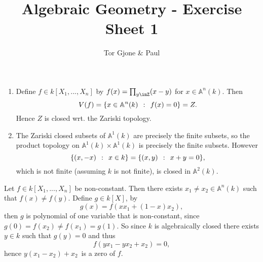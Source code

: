 \documentclass[a4paper,11pt,english]{article}
\title{\textbf{Algebraic Geometry} - Exercise Sheet 1}
\author{Tor Gjone \& Paul}
\def\A{\mathbb{A}}
\begin{document}
\mmaketitle


\begin{solution}[1] \vspace{-.8cm}
\begin{enumerate}
\item Define $f\in k[X_1,...,X_n]$ by $f(x) = \prod_{y \inZ} (x - y)$ for $x
\in \A^n(k)$. Then 
\[ V(f) = \{ x \in \A^n(k) \q: f(x) =0 \} = Z. \] Hence $Z$ is
closed wrt. the Zariski topology.
\item
The Zariski closed subsets of $\A^1(k)$ are precisely the finite subsets,
so the product topology on $\A^1(k) \times \A^1(k)$ is precisely the
finite subsets. However 
\[ \{ (x,-x) \:\::\:\: x\in k \} = \{ (x,y) \:\::\:\: x+y = 0 \}, \]
which is not finite (assuming $k$ is not finite), is closed in $\A^2(k)$. 
\end{enumerate}
\end{solution} 


\begin{solution}[2]
Let $f \in k[X_1,...,X_{n}]$ be non-constant. Then there exists $x_1 \ne x_2 \in
\A^n(k)$ such that $f(x) \ne f(y)$. 
Define $g \in k[X]$, by 
\[ g(x) = f(x x_1 + (1-x) x_2), \]
then $g$ is polynomial of one variable that is non-constant, since $g(0) =
f(x_2) \ne f(x_1) = g(1)$. 
So since $k$ is algebraically closed there exists $y \in k$ such that $g(y) =
0$ and thus 
\[ f(y x_1 - y x_2 + x_2) = 0, \]
hence $y (x_1 - x_2) + x_2$ is a zero of $f$.
\end{solution}
\end{document}
